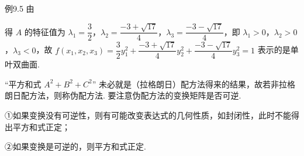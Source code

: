 \begin{fcard}{例9.5}
由


得 $A$ 的特征值为 $\lambda_1=\dfrac32$，$\lambda_2=\dfrac{-3+\sqrt{17}}{4}$，$\lambda_3=\dfrac{-3-\sqrt{17}}{4}$，即 $\lambda_1>0$，$\lambda_2>0$，$\lambda_3<0$，故 $f(x_1,x_2,x_3)=\dfrac32y_1^2+\dfrac{-3+\sqrt{17}}{4}y_2^2+\dfrac{-3-\sqrt{17}}{4}y_3^2=1$ 表示的是单叶双曲面.
\end{fcard}



“平方和式 $A^2+B^2+C^2$” 未必就是（拉格朗日）配方法得来的结果，故若非拉格朗日配方法，则称伪配方法. 要注意伪配方法的变换矩阵是否可逆.

①如果变换没有可逆性，则有可能改变表达式的几何性质，如封闭性，此时不能得出平方和式正定；

②如果变换是可逆的，则平方和式正定.

